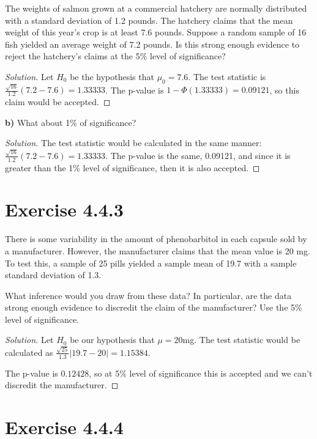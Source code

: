\documentclass[titlepage, letterpaper, fleqn]{article}
\newcommand{\spacepls}{\vspace{5mm}}
\renewcommand\qedsymbol{\(\blacksquare\)}
\newenvironment{solution}
{\renewcommand\qedsymbol{$\square$}\begin{proof}[Solution]}
{\end{proof}}
\begin{document}
{\large The weights of salmon grown at a commercial hatchery are normally distributed with a standard deviation of 1.2 pounds.
The hatchery claims that the mean weight of this year's crop is at least 7.6 pounds.
Suppose a random sample of 16 fish yielded an average weight of 7.2 pounds.
Is this strong enough evidence to reject the hatchery's claims at the 5\% level of significance?}

\begin{solution}
Let $H_0$ be the hypothesis that $\mu_0 = 7.6$.
The test statistic is $\frac{\sqrt{16}}{1.2}(7.2-7.6) = 1.33333$.
The p-value is $1 - \Phi(1.33333) = 0.09121$, so this claim would be accepted.
\end{solution}

\spacepls

{\large \textbf{b)} What about 1\% of significance?}

\begin{solution}
The test statistic would be calculated in the same manner: $\frac{\sqrt{16}}{1.2}(7.2-7.6) = 1.33333$.
The p-value is the same, 0.09121, and since it is greater than the 1\% level of significance, then it is also accepted.
\end{solution}

\spacepls

\section{Exercise 4.4.3}

{\large There is some variability in the amount of phenobarbitol in each capsule sold by a manufacturer.
However, the manufacturer claims that the mean value is 20 mg.
To test this, a sample of 25 pills yielded a sample mean of 19.7 with a sample standard deviation of 1.3.

What inference would you draw from these data?
In particular, are the data strong enough evidence to discredit the claim of the manufacturer?
Use the 5\% level of significance.}

\begin{solution}
Let $H_0$ be our hypothesis that $\mu = 20$mg.
The test statistic would be calculated as $\frac{\sqrt{25}}{1.3}|19.7-20| = 1.15384$.

The p-value is $0.12428$, so at 5\% level of significance this is accepted and we can't discredit the manufacturer.
\end{solution}

\spacepls

\section{Exercise 4.4.4}
\end{document}
